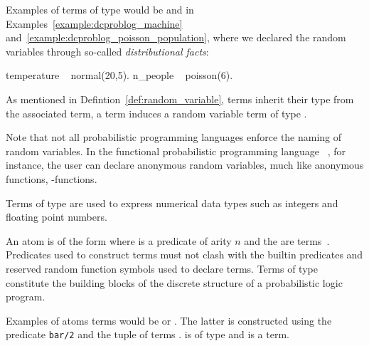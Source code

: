 Examples of terms of type  would be  and  in Examples~\ref{example:dcproblog_machine} and~\ref{example:dcproblog_poisson_population}, where we declared the random variables through so-called {\em distributional facts}: 
\begin{problog}
temperature ~ normal(20,5).
n_people ~ poisson(6).
\end{problog}
As mentioned in Defintion~\ref{def:random_variable},  terms inherit their type from the associated  term, \eg a  term induces a random variable term of type .

Note that not all probabilistic programming languages enforce the naming of random variables. In the functional probabilistic programming language \anglicansty~\citep{wood2014approach}, for instance, the user can declare anonymous random variables, much like anonymous functions, \ie \textlambda-functions.

\begin{definition} Terms of type  are used to express numerical data types such as integers and floating point numbers.	
\end{definition}


\begin{definition}
	An atom is of the form  where  is a predicate of arity $n$ and the  are  terms~\citep{fierens2015inference}. Predicates used to construct  terms must not clash with the builtin predicates and reserved random function symbols used to declare  terms. Terms of type  constitute the building blocks of the discrete structure of a probabilistic logic program.
\end{definition}

Examples of atoms terms would be  or . The latter is constructed using the predicate \lstinline{bar/2} and the tuple of  terms .  is of type  and  is a  term.
























